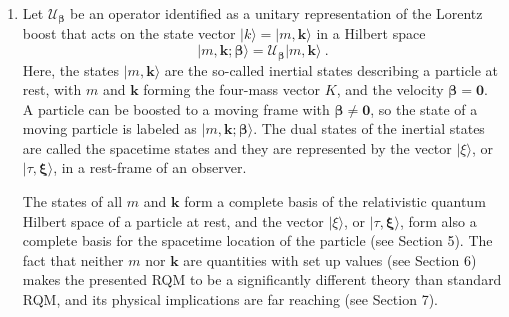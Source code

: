 \documentclass[12pt]{iopart}
\begin{document}
\begin{enumerate}
\item Let $\mathcal{U}_{\boldsymbol{\beta}}$ be an operator identified as a unitary 
representation of the Lorentz boost that acts on the state vector $\vert k\rangle=\vert m,
\boldsymbol{k\rangle}$ in a Hilbert space
%
	\begin{equation}
        \vert m, \boldsymbol{k};\boldsymbol{\beta}\rangle = \mathcal{U}_{\boldsymbol{\beta}}\vert 
        m,\boldsymbol{k}\rangle\ .
        \label{S3eq4}
	\end{equation}
%
Here, the states $\vert m,\boldsymbol{k}\rangle$ are the so-called inertial states describing 
a particle at rest, with $m$ and $\boldsymbol{k}$ forming the four-mass vector $K$, and 
the velocity $\boldsymbol{\beta}=\boldsymbol{0}$.  A particle can be boosted to a moving 
frame with $\boldsymbol{\beta}\neq\boldsymbol{0}$, so the state of a moving particle is 
labeled as $\vert m,\boldsymbol{k};\boldsymbol{\beta}\rangle$.  The dual states of the inertial 
states are called the spacetime states and they are represented by the vector $\vert\xi\rangle$, 
or $\vert\tau,\boldsymbol{\xi}\rangle$, in a rest-frame of an observer. 

The states of all $m$ and $\boldsymbol{k}$ form a complete basis of the relativistic quantum 
Hilbert space of a particle at rest, and the vector $\vert\xi\rangle$, or $\vert\tau,\boldsymbol{\xi}
\rangle$, form also a complete basis for the spacetime location of the particle (see Section 5).  
The fact that neither $m$ nor $\boldsymbol{k}$ are quantities with set up values (see Section 
6) makes the presented RQM to be a significantly different theory than standard RQM, and 
its physical implications are far reaching (see Section 7). 
%


\end{enumerate}
\end{document}
